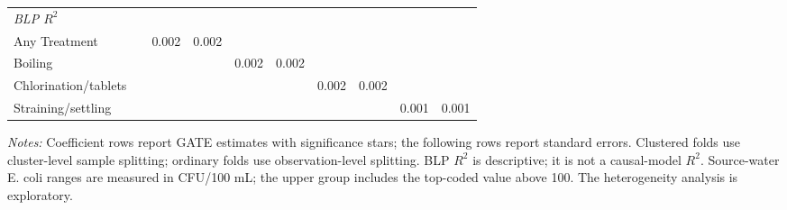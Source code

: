 \begin{landscape}
\begin{table}[p]
\begin{adjustbox}{max width=\linewidth, center}
\begin{tabular}{llcccccccc}
\multicolumn{10}{l}{\textit{BLP $R^{2}$}} \\
\quad Any Treatment &  & 0.002 & 0.002 &  &  &  &  &  &  \\
\quad Boiling &  &  &  & 0.002 & 0.002 &  &  &  &  \\
\quad Chlorination/tablets &  &  &  &  &  & 0.002 & 0.002 &  &  \\
\quad Straining/settling &  &  &  &  &  &  &  & 0.001 & 0.001 \\
\bottomrule
\end{tabular}
\end{adjustbox}
\par\vspace{3pt}
\begin{minipage}{\linewidth}\footnotesize \textit{Notes:} Coefficient rows report GATE estimates with significance stars; the following rows report standard errors. Clustered folds use cluster-level sample splitting; ordinary folds use observation-level splitting. BLP $R^2$ is descriptive; it is not a causal-model $R^2$. Source-water E. coli ranges are measured in CFU/100 mL; the upper group includes the top-coded value above 100. The heterogeneity analysis is exploratory.\end{minipage}
\end{table}
\end{landscape}